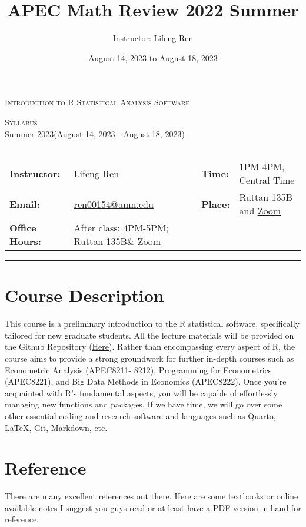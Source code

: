 \documentclass{article}
\title{APEC Math Review 2022 Summer}
\author{Instructor: Lifeng Ren}
\date{August 14, 2023 to August 18, 2023}
\begin{document}
\thispagestyle{plain}
\begin{center}
{\LARGE \textsc{Introduction to R Statistical Analysis Software}}
\end{center}
\begin{center}
\large \textsc{Syllabus}\\
Summer 2023(August 14, 2023 - August 18, 2023)
\end{center}

\begin{center}
\rule{6.5in}{0.4pt}
\begin{tabular}{llll}
\textbf{Instructor:} & Lifeng Ren &   \textbf{Time:} & 1PM-4PM, Central Time \\
\textbf{Email:} &\href{mailto:ren00154@umn.edu}{ren00154@umn.edu}  &   \textbf{Place:} & Ruttan 135B and \href{https://umn.zoom.us/j/96218181588?pwd=ZFVrdWQ0bkZyb2N2Wkdwc0JnUk9CQT09}{Zoom}\\
\textbf{Office Hours:} & After class: 4PM-5PM; Ruttan 135B\& \href{https://umn.zoom.us/j/96218181588?pwd=ZFVrdWQ0bkZyb2N2Wkdwc0JnUk9CQT09}{Zoom}&
\end{tabular}
\rule{6.5in}{0.4pt}
\end{center}

\section*{Course Description}
This course is a preliminary introduction to the R statistical software, specifically tailored for new graduate students. All the lecture materials will be provided on the Github Repository (\href{https://github.com/lfr00154/R-review2023}{Here}). Rather than encompassing every aspect of R, the course aims to provide a strong groundwork for further in-depth courses such as Econometric Analysis (APEC8211- 8212), Programming for Econometrics (APEC8221), and Big Data Methods in Economics (APEC8222). Once you're acquainted with R's fundamental aspects, you will be capable of effortlessly managing new functions and packages. If we have time, we will go over some other essential coding and research software and languages such as Quarto, \LaTeX, Git, Markdown, etc.



\section*{Reference}
There are many excellent references out there. Here are some textbooks or online available notes I suggest you guys read or at least have a PDF version in hand for reference. 
\end{document}
